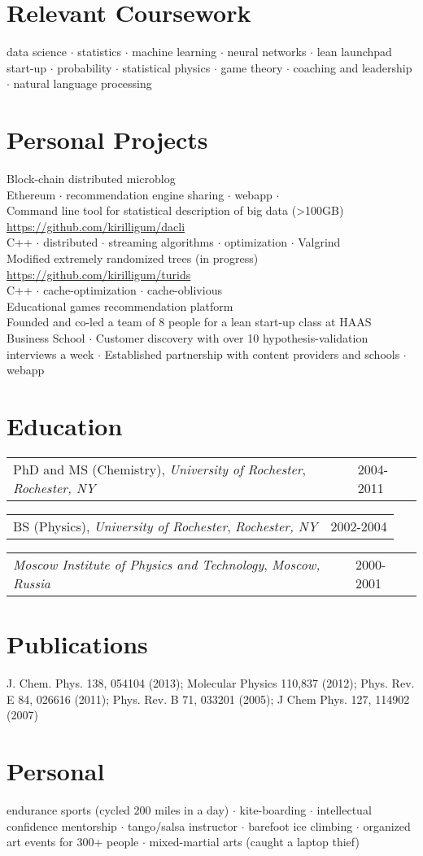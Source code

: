 \documentclass{res}
\makeatletter
\newcommand{\af}[3]{
\begin{tabular*}{\textwidth}[t]{@{}p{5.2in} l} 
    #1, \textit{#2} & #3\\
  \end{tabular*}
}
\newcommand{\skills}[2]{
  #1\\
  {\color[RGB]{106,106,106} #2}\\
}
\makeatother
\begin{document}
\begin{resume}
\section{Relevant Coursework}
  data science $\cdot$
  statistics $\cdot$
  machine learning $\cdot$
  neural networks $\cdot$
  lean launchpad start-up $\cdot$
  probability $\cdot$
  statistical physics $\cdot$
  game theory $\cdot$
  coaching and leadership $\cdot$
  natural language processing
\\

\section{Personal Projects}
\skills{Block-chain distributed microblog}{
	Ethereum $\cdot$
	recommendation engine sharing $\cdot$
	webapp $\cdot$
}
\skills{Command line tool for statistical description of big data (>100GB) \url{https://github.com/kirilligum/dacli}}{
	C++ $\cdot$
	distributed $\cdot$
	streaming algorithms $\cdot$
	optimization $\cdot$
	Valgrind
}
\skills{Modified extremely randomized trees (in progress) \url{https://github.com/kirilligum/turids}}{
	C++ $\cdot$
	cache-optimization $\cdot$
	cache-oblivious
}
\skills{Educational games recommendation platform}{
  Founded and co-led a team of 8 people for a lean start-up class at HAAS Business School $\cdot$ 
  Customer discovery with over 10 hypothesis-validation interviews a week $\cdot$ 
  Established partnership with content providers and schools $\cdot$
  webapp
}

\section{Education}          
\af{PhD and MS (Chemistry), \textit{University of Rochester}}{Rochester, NY}{2004-2011}
\af{BS (Physics), \textit{University of Rochester}}{Rochester, NY}{2002-2004}
\af{\textit{Moscow Institute of Physics and Technology}}{Moscow, Russia} {2000-2001}
\section{Publications}
  J. Chem. Phys.  138, 054104 (2013);
  Molecular Physics 110,837 (2012);
  Phys. Rev. E 84, 026616 (2011);
  Phys. Rev. B 71, 033201 (2005);
  J Chem Phys. 127, 114902 (2007)
\\

\section{Personal}          
endurance sports (cycled 200 miles in a day) $\cdot$
kite-boarding $\cdot$
intellectual confidence mentorship $\cdot$
tango/salsa instructor $\cdot$
barefoot ice climbing $\cdot$
organized art events for 300+ people $\cdot$
mixed-martial arts (caught a laptop thief)
 
\end{resume}
\end{document}
